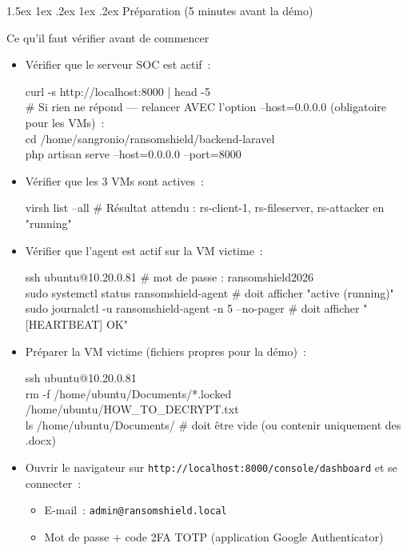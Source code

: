 \documentclass[a4paper,11pt]{article}
\makeatletter
\renewcommand{\section}{\@startsection{section}{1}{\z@}%
  {1.5ex \@plus 1ex \@minus .2ex}%
  {1ex \@plus .2ex}%
  {\large\bfseries\color{ifriblue}}}
\newcommand{\ok}{\textcolor{normgreen}{\faCheckCircle}\ }
\newcommand{\clic}[1]{\texttt{\small #1}}
\makeatother
\begin{document}
\section{Préparation (5 minutes avant la démo)}

\begin{checkbox}{Ce qu'il faut vérifier avant de commencer}
\begin{itemize}[leftmargin=1.5em,itemsep=3pt]
  \item[\ok] Vérifier que le serveur SOC est actif~:
    \begin{cmdbox}
curl -s http://localhost:8000 | head -5\\
\# Si rien ne répond --- relancer AVEC l'option --host=0.0.0.0 (obligatoire pour les VMs)~:\\
cd /home/sangronio/ransomshield/backend-laravel\\
php artisan serve --host=0.0.0.0 --port=8000
    \end{cmdbox}

  \item[\ok] Vérifier que les 3 VMs sont actives~:
    \begin{cmdbox}
virsh list --all
\# Résultat attendu : rs-client-1, rs-fileserver, rs-attacker en "running"
    \end{cmdbox}

  \item[\ok] Vérifier que l'agent est actif sur la VM victime~:
    \begin{cmdbox}
ssh ubuntu@10.20.0.81     \# mot de passe : ransomshield2026\\
sudo systemctl status ransomshield-agent   \# doit afficher "active (running)"\\
sudo journalctl -u ransomshield-agent -n 5 --no-pager   \# doit afficher "[HEARTBEAT] OK"
    \end{cmdbox}

  \item[\ok] Préparer la VM victime (fichiers propres pour la démo)~:
    \begin{cmdbox}
ssh ubuntu@10.20.0.81\\
rm -f /home/ubuntu/Documents/*.locked /home/ubuntu/HOW\_TO\_DECRYPT.txt\\
ls /home/ubuntu/Documents/   \# doit être vide (ou contenir uniquement des .docx)
    \end{cmdbox}

  \item[\ok] Ouvrir le navigateur sur
    \clic{http://localhost:8000/console/dashboard} et se connecter~:
    \begin{itemize}[leftmargin=1em]
      \item E-mail~: \texttt{admin@ransomshield.local}
      \item Mot de passe + code 2FA TOTP (application Google Authenticator)
    \end{itemize}


\end{itemize}
\end{checkbox}
\end{document}
